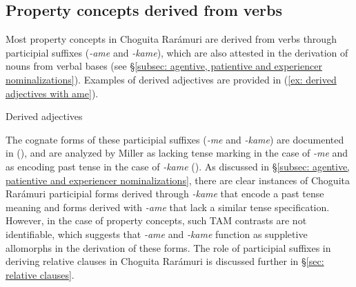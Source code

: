 \subsection{Property concepts derived from verbs}
\label{subsec: property concepts derived from verbs}

Most property concepts in Choguita Rarámuri are derived from verbs through participial suffixes (\textit{-ame} and \textit{-kame}), which are also attested in the derivation of nouns from verbal bases (see §\ref{subsec: agentive, patientive and experiencer nominalizations}). Examples of derived adjectives are provided in (\ref{ex: derived adjectives with ame}).


\ea\label{ex: derived adjectives with ame}
{Derived adjectives}

    \label{ex: derived adjectives with amea}
        \label{ex: derived adjectives with ameb}
            \label{ex: derived adjectives with amec}
                \label{ex: derived adjectives with amed}
                    \label{ex: derived adjectives with amee}
                        \label{ex: derived adjectives with amef}
    \z
\z

\hspace*{-1.3pt}The cognate forms of these participial suffixes (\textit{-me} and \textit{-kame}) are documented in  (\citealt{miller1996guarijio}), and are analyzed by Miller as lacking tense marking in the case of \textit{-me} and as encoding past tense in the case of \textit{-kame} (\citeyear[180]{miller1996guarijio}). As discussed in §\ref{subsec: agentive, patientive and experiencer nominalizations}, there are clear instances of Choguita Rarámuri participial forms derived through \textit{-kame} that encode a past tense meaning and forms derived with \textit{-ame} that lack a similar tense specification. However, in the case of property concepts, such TAM contrasts are not identifiable, which suggests that \textit{-ame} and \textit{-kame} function as suppletive allomorphs in the derivation of these forms. The role of participial suffixes in deriving relative clauses in Choguita Rarámuri is discussed further in §\ref{sec: relative clauses}.

